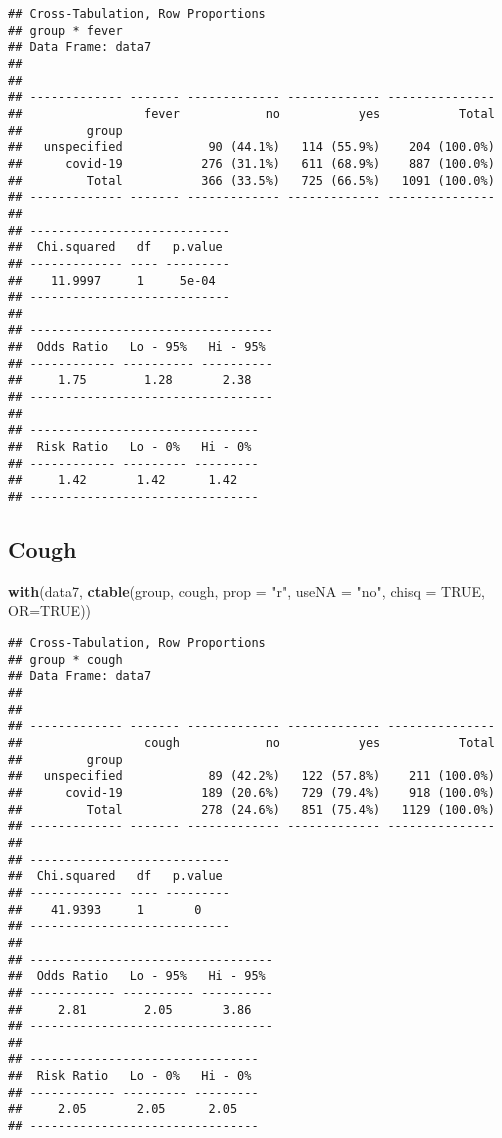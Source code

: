 \documentclass[
]{article}
\newenvironment{Shaded}{\begin{snugshade}}{\end{snugshade}}
\newcommand{\DataTypeTok}[1]{\textcolor[rgb]{0.13,0.29,0.53}{#1}}
\newcommand{\KeywordTok}[1]{\textcolor[rgb]{0.13,0.29,0.53}{\textbf{#1}}}
\newcommand{\NormalTok}[1]{#1}
\newcommand{\OtherTok}[1]{\textcolor[rgb]{0.56,0.35,0.01}{#1}}
\newcommand{\StringTok}[1]{\textcolor[rgb]{0.31,0.60,0.02}{#1}}
\begin{document}
\begin{verbatim}
## Cross-Tabulation, Row Proportions  
## group * fever  
## Data Frame: data7  
## 
## 
## ------------- ------- ------------- ------------- ---------------
##                 fever            no           yes           Total
##         group                                                    
##   unspecified            90 (44.1%)   114 (55.9%)    204 (100.0%)
##      covid-19           276 (31.1%)   611 (68.9%)    887 (100.0%)
##         Total           366 (33.5%)   725 (66.5%)   1091 (100.0%)
## ------------- ------- ------------- ------------- ---------------
## 
## ----------------------------
##  Chi.squared   df   p.value 
## ------------- ---- ---------
##    11.9997     1     5e-04  
## ----------------------------
## 
## ----------------------------------
##  Odds Ratio   Lo - 95%   Hi - 95% 
## ------------ ---------- ----------
##     1.75        1.28       2.38   
## ----------------------------------
## 
## --------------------------------
##  Risk Ratio   Lo - 0%   Hi - 0% 
## ------------ --------- ---------
##     1.42       1.42      1.42   
## --------------------------------
\end{verbatim}

\hypertarget{cough}{%
\subsection{Cough}\label{cough}}

\begin{Shaded}
\begin{Highlighting}[]
\KeywordTok{with}\NormalTok{(data7, }\KeywordTok{ctable}\NormalTok{(group, cough, }\DataTypeTok{prop =} \StringTok{"r"}\NormalTok{, }\DataTypeTok{useNA =} \StringTok{"no"}\NormalTok{, }\DataTypeTok{chisq =} \OtherTok{TRUE}\NormalTok{, }\DataTypeTok{OR=}\OtherTok{TRUE}\NormalTok{))}
\end{Highlighting}
\end{Shaded}

\begin{verbatim}
## Cross-Tabulation, Row Proportions  
## group * cough  
## Data Frame: data7  
## 
## 
## ------------- ------- ------------- ------------- ---------------
##                 cough            no           yes           Total
##         group                                                    
##   unspecified            89 (42.2%)   122 (57.8%)    211 (100.0%)
##      covid-19           189 (20.6%)   729 (79.4%)    918 (100.0%)
##         Total           278 (24.6%)   851 (75.4%)   1129 (100.0%)
## ------------- ------- ------------- ------------- ---------------
## 
## ----------------------------
##  Chi.squared   df   p.value 
## ------------- ---- ---------
##    41.9393     1       0    
## ----------------------------
## 
## ----------------------------------
##  Odds Ratio   Lo - 95%   Hi - 95% 
## ------------ ---------- ----------
##     2.81        2.05       3.86   
## ----------------------------------
## 
## --------------------------------
##  Risk Ratio   Lo - 0%   Hi - 0% 
## ------------ --------- ---------
##     2.05       2.05      2.05   
## --------------------------------
\end{verbatim}
\end{document}
